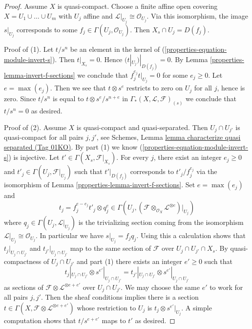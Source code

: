 \documentclass{amsart}
\theoremstyle{plain}
\theoremstyle{definition}
\theoremstyle{remark}
\numberwithin{equation}{subsection}
\begin{document}
\begin{proof}
Assume $X$ is quasi-compact. Choose a finite affine open covering
$X = U_1 \cup \ldots \cup U_m$ with $U_j$ affine and
$\mathcal{L}|_{U_j} \cong \mathcal{O}_{U_j}$. Via this isomorphism,
the image $s|_{U_j}$ corresponds to some
$f_j \in \Gamma(U_j, \mathcal{O}_{U_j})$. Then
$X_s \cap U_j = D(f_j)$.

\medskip\noindent
Proof of (1). Let $t/s^n$ be an element in the kernel of
(\ref{properties-equation-module-invert-s}). Then $t|_{X_s} = 0$.
Hence $(t|_{U_j})|_{D(f_j)} = 0$. By
Lemma \ref{properties-lemma-invert-f-sections} we conclude that
$f_j^{e_j} t|_{U_j} = 0$ for some
$e_j \geq 0$. Let $e = \max(e_j)$. Then we see that $t \otimes s^e$
restricts to zero on $U_j$ for all $j$, hence is zero. Since $t/s^n$
is equal to $t \otimes s^e/s^{n + e}$ in
$\Gamma_*(X, \mathcal{L}, \mathcal{F})_{(s)}$ we conclude that $t/s^n = 0$
as desired.

\medskip\noindent
Proof of (2). Assume $X$ is quasi-compact and quasi-separated.
Then $U_j \cap U_{j'}$ is quasi-compact for all pairs $j, j'$, see
Schemes, Lemma \href{https://stacks.math.columbia.edu/tag/01KO}{lemma characterize quasi separated (Tag 01KO)}.
By part (1) we know (\ref{properties-equation-module-invert-s}) is injective.
Let $t' \in \Gamma(X_s, \mathcal{F}|_{X_s})$. For every $j$, there exist an
integer $e_j \geq 0$ and $t'_j \in \Gamma(U_j, \mathcal{F}|_{U_j})$ such that
$t'|_{D(f_j)}$ corresponds to $t'_j/f_j^{e_j}$
via the isomorphism of Lemma \ref{properties-lemma-invert-f-sections}.
Set $e = \max(e_j)$ and
$$
t_j = f_j^{e - e_j} t'_j \otimes q_j^e \in
\Gamma(U_j,
(\mathcal{F} \otimes_{\mathcal{O}_X} \mathcal{L}^{\otimes e})|_{U_j})
$$
where $q_j \in \Gamma(U_j, \mathcal{L}|_{U_j})$ is the trivializing
section coming from the isomorphism
$\mathcal{L}|_{U_j} \cong \mathcal{O}_{U_j}$. In particular we have
$s|_{U_j} = f_j q_j$. Using this a calculation shows that
$t_j|_{U_j \cap U_{j'}}$ and $t_{j'}|_{U_j \cap U_{j'}}$
map to the same section of $\mathcal{F}$ over $U_j \cap U_{j'} \cap X_s$.
By quasi-compactness of $U_j \cap U_{j'}$ and part (1) there exists an
integer $e' \geq 0$ such that
$$
t_j|_{U_j \cap U_{j'}} \otimes s^{e'}|_{U_j \cap U_{j'}} =
t_{j'}|_{U_j \cap U_{j'}} \otimes s^{e'}|_{U_j \cap U_{j'}}
$$
as sections of $\mathcal{F} \otimes \mathcal{L}^{\otimes e + e'}$ over
$U_j \cap U_{j'}$. We may choose the same $e'$ to work for all pairs
$j, j'$. Then the sheaf conditions implies there is a section
$t \in \Gamma(X, \mathcal{F} \otimes \mathcal{L}^{\otimes e + e'})$
whose restriction to $U_j$ is $t_j \otimes s^{e'}|_{U_j}$.
A simple computation shows that $t/s^{e + e'}$ maps to $t'$
as desired.
\end{proof}
\end{document}
